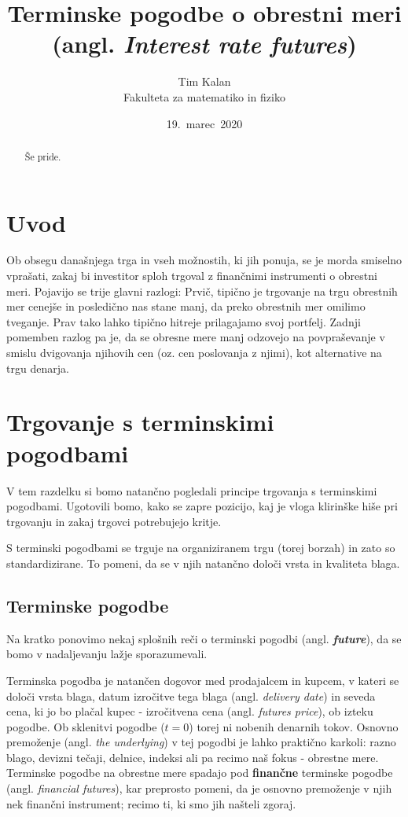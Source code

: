 \documentclass[a4paper]{article}
\author{Tim Kalan \\ Fakulteta za matematiko in fiziko}
\title{
    Terminske pogodbe o obrestni meri \\ 
    \large (angl. \textit{Interest rate futures})}
\date{19.\ marec\ 2020} %
\begin{document}
\maketitle

\pagebreak

\begin{abstract}
    Še pride.
\end{abstract}

\pagebreak

\tableofcontents

\pagebreak

\section{Uvod}
Ob obsegu današnjega trga in vseh možnostih, ki jih ponuja, se je morda smiselno vprašati,
zakaj bi investitor sploh trgoval z finančnimi instrumenti o obrestni meri. Pojavijo se trije
glavni razlogi: Prvič, tipično je trgovanje na trgu obrestnih mer cenejše in posledično nas 
stane manj, da preko obrestnih mer omilimo tveganje. Prav tako lahko tipično hitreje prilagajamo svoj 
portfelj. Zadnji pomemben razlog pa je, da se obresne mere manj odzovejo na povpraševanje v 
smislu dvigovanja njihovih cen (oz. cen poslovanja z njimi), kot alternative na trgu denarja.

\section{Trgovanje s terminskimi pogodbami}
V tem razdelku si bomo natančno pogledali principe trgovanja s terminskimi pogodbami. Ugotovili
bomo, kako se zapre pozicijo, kaj je vloga klirinške hiše pri trgovanju in zakaj trgovci potrebujejo
kritje.

S terminski pogodbami se trguje na organiziranem trgu (torej borzah) in zato so standardizirane. 
To pomeni, da se v njih natančno določi vrsta in kvaliteta blaga.

\subsection{Terminske pogodbe}
Na kratko ponovimo nekaj splošnih reči o terminski pogodbi (angl. \textit{\textbf{future}}), da se 
bomo v nadaljevanju lažje sporazumevali.

Terminska pogodba je natančen dogovor med prodajalcem in kupcem, v kateri se določi vrsta
blaga, datum izročitve tega blaga (angl. \textit{delivery date}) in seveda cena, 
ki jo bo plačal kupec - izročitvena cena (angl. \textit{futures price}), ob izteku pogodbe. 
Ob sklenitvi pogodbe ($t = 0$) torej ni nobenih denarnih tokov.
Osnovno premoženje (angl. \textit{the underlying}) v tej pogodbi je lahko praktično karkoli: 
razno blago, devizni tečaji, delnice, indeksi ali pa recimo naš fokus - obrestne mere. 
Terminske pogodbe na obrestne mere spadajo pod \textbf{finančne} terminske pogodbe 
(angl. \textit{financial futures}), kar preprosto pomeni, da je osnovno premoženje v njih nek
finančni instrument; recimo ti, ki smo jih našteli zgoraj.
\end{document}
